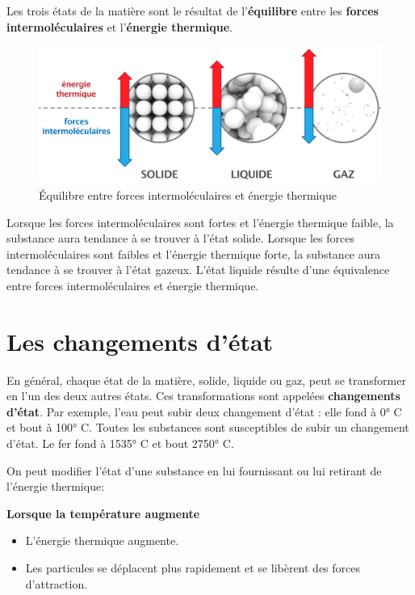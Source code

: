 \documentclass[
  11pt,
  a4paper,
  openany]{book}
\providecommand{\tightlist}{%
  \setlength{\itemsep}{0pt}\setlength{\parskip}{0pt}}
\begin{document}
Les trois états de la matière sont le résultat de l'\textbf{équilibre} entre les \textbf{forces intermoléculaires} et l'\textbf{énergie thermique}.

\begin{figure}

{\centering \includegraphics[width=0.67\linewidth]{images/mvt-thermique} 

}

\caption{Équilibre entre forces intermoléculaires et énergie thermique}\label{fig:mvt-thermique}
\end{figure}

Lorsque les forces intermoléculaires sont fortes et l'énergie thermique faible, la substance aura tendance à se trouver à l'état solide. Lorsque les forces intermoléculaires sont faibles et l'énergie thermique forte, la substance aura tendance à se trouver à l'état gazeux. L'état liquide résulte d'une équivalence entre forces intermoléculaires et énergie thermique.

\hypertarget{les-changements-duxe9tat}{%
\section{Les changements d'état}\label{les-changements-duxe9tat}}

En général, chaque état de la matière, solide, liquide ou gaz, peut se transformer en l'un des deux autres états. Ces transformations sont appelées \textbf{changements d'état}. Par exemple, l'eau peut subir deux changement d'état : elle fond à 0° C et bout à 100° C. Toutes les substances sont susceptibles de subir un changement d'état. Le fer fond à 1535° C et bout 2750° C.

On peut modifier l'état d'une substance en lui fournissant ou lui retirant de l'énergie thermique:

\textbf{Lorsque la température augmente}

\begin{itemize}
\tightlist
\item
  L'énergie thermique augmente.
\item
  Les particules se déplacent plus rapidement et se libèrent des forces d'attraction.
\end{itemize}
\end{document}
